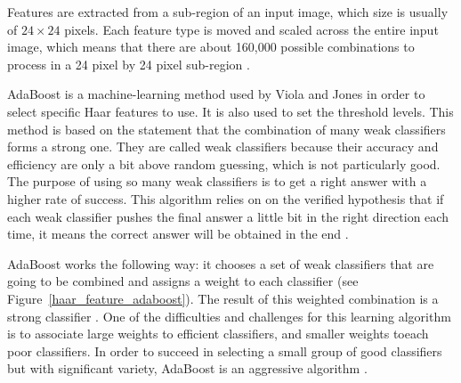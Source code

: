 \vspace{\baselineskip}
\noindent Features are extracted from a sub-region of an input image, which size is usually of $ 24\times24 $ pixels. Each feature type is moved and scaled across the entire input image, which means that there are about 160,000 possible combinations to process in a 24 pixel by 24 pixel sub-region \cite{SMY07}.
\newline

\noindent AdaBoost is a machine-learning method used by Viola and Jones in order to select specific Haar features to use. It is also used to set the threshold levels. This method is based on the statement that the combination of many weak classifiers forms a strong one. They are called weak classifiers because their accuracy and efficiency are only a bit above random guessing, which is not particularly good. The purpose of using so many weak classifiers is to get a right answer with a higher rate of success. This algorithm relies on on the verified hypothesis that if each weak classifier pushes the final answer a little bit in the right direction each time, it means the correct answer will be obtained in the end \cite{HEW07}. 
\newline

\noindent AdaBoost works the following way: it chooses a set of weak classifiers that are going to be combined and assigns a weight to each classifier (see Figure~\ref{haar_feature_adaboost}). The result of this weighted combination is a strong classifier \cite{HEW07}. One of the difficulties and challenges for this learning algorithm is to associate large weights to efficient classifiers, and smaller weights toeach poor classifiers. In order to succeed in selecting a small group of good classifiers but with significant variety, AdaBoost is an aggressive algorithm \cite{VIO01}.
\newline

